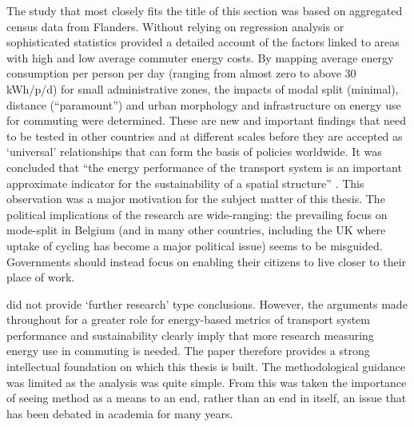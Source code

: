 The study that most closely fits the title of this section
was based on aggregated census data from Flanders. Without relying on
regression analysis  or sophisticated statistics \citet{Boussauw2009}
provided a detailed account of the factors linked to areas with
high and low average commuter energy costs. By mapping average
energy consumption per person per day (ranging from almost zero
to above 30 kWh/p/d) for small administrative zones, the impacts of
modal split (minimal), distance (``paramount'') and urban morphology and
infrastructure on energy use for commuting were determined. These are new
and important findings that need to be tested in other countries
and at different scales
before they are accepted as `universal' relationships that can form the basis of
policies worldwide. It was concluded that
``the energy performance of the transport system is an important approximate
indicator for the sustainability of a spatial structure'' \citep[590]{Boussauw2009}.
This observation was a major motivation for the subject matter of this thesis.
The political implications of the research are wide-ranging: the prevailing
focus on mode-split in Belgium (and in many other countries, including the
UK where uptake of cycling has become a major political issue) seems to be misguided.
Governments should instead focus on enabling their citizens to live closer to their
place of work.

\citet{Boussauw2009} did not provide `further research' type conclusions. However,
the arguments made throughout for a greater role for energy-based metrics of
transport system performance and sustainability clearly imply that more
research measuring energy use in commuting is needed. The paper therefore
provides a strong intellectual foundation on which this thesis is built.
The methodological guidance was limited as the analysis was quite simple.
From this was taken the importance of seeing method as a means to an end,
rather than an end in itself, an issue that has been debated in academia for
many years. 

% 

